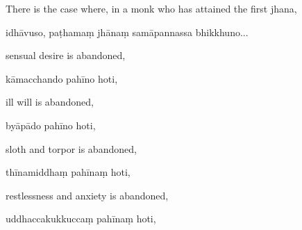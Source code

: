 \begin{samepage}
\begin{leftcolumn*}
There is the case where, in a monk who has attained the first jhana,
\end{leftcolumn*}

\begin{rightcolumn}
idhāvuso, paṭhamaṃ jhānaṃ samāpannassa bhikkhuno...
\end{rightcolumn}
\end{samepage}

\begin{samepage}
\begin{leftcolumn*}
sensual desire is abandoned,
\end{leftcolumn*}

\begin{rightcolumn}
kāmacchando pahīno hoti,
\end{rightcolumn}
\end{samepage}

\begin{samepage}
\begin{leftcolumn*}
ill will is abandoned,
\end{leftcolumn*}

\begin{rightcolumn}
byāpādo pahīno hoti,
\end{rightcolumn}
\end{samepage}

\begin{samepage}
\begin{leftcolumn*}
sloth and torpor is abandoned,
\end{leftcolumn*}

\begin{rightcolumn}
thīnamiddhaṃ pahīnaṃ hoti,
\end{rightcolumn}
\end{samepage}

\begin{samepage}
\begin{leftcolumn*}
restlessness and anxiety is abandoned,
\end{leftcolumn*}

\begin{rightcolumn}
uddhaccakukkuccaṃ pahīnaṃ hoti,
\end{rightcolumn}
\end{samepage}

